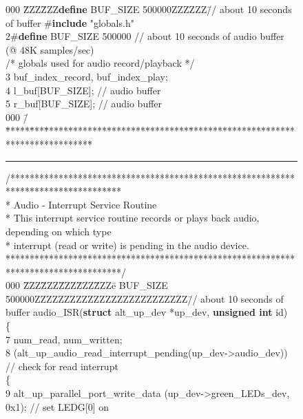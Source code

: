 \documentclass[11pt, twoside, pdftex]{article}
\begin{document}
\begin{figure}[h!]
\begin{center}
\begin{minipage}[t]{12.5 cm}
\begin{tabbing}
000 \=ZZZ\=ZZZ\={\bf define} BUF\_SIZE 500000ZZZZZZ\=// about 10 seconds of buffer \>\#{\bf include} "globals.h"\\
2\>\#{\bf define} BUF\_SIZE 500000 \>\>\>// about 10 seconds of audio buffer (@ 48K samples/sec)\\
\>/* globals used for audio record/playback */\\
3 buf\_index\_record, buf\_index\_play;\\
4 l\_buf[BUF\_SIZE]; \>\>\>// audio buffer\\
5 r\_buf[BUF\_SIZE]; \>\>\>// audio buffer\\
000 \=/\=*****\=***\=******************************\=****************************************\=\kill
\rule{6.0in}{0in} 
\>/***********************************************************************************\\
\>\>* Audio - Interrupt Service Routine                                \\
\>\>* This interrupt service routine records or plays back audio, depending on which type\\
\>\>* interrupt (read or write) is pending in the audio device.\\
\>\>************************************************************************************/\\
000 \=ZZZ\=ZZZ\=ZZZ\=ZZZ\=ZZZ\=e  BUF\_SIZE 500000ZZZZZZZZZZZZZZZZZZZZZZZZZZ\=// about 10 seconds of buffer   audio\_ISR({\bf struct} alt\_up\_dev *up\_dev, {\bf unsigned int} id)\\
\>\{\\
7 \> num\_read, num\_written;\\
8 \> (alt\_up\_audio\_read\_interrupt\_pending(up\_dev->audio\_dev)) \>\>\>\>\>// check for read interrupt\\
\>\>\{\\
9 \>\>\>alt\_up\_parallel\_port\_write\_data (up\_dev->green\_LEDs\_dev, 0x1);  \>\>\>\>// set LEDG[0] on\\


\end{tabbing}
\end{minipage}
\end{center}
\end{figure}
\end{document}
